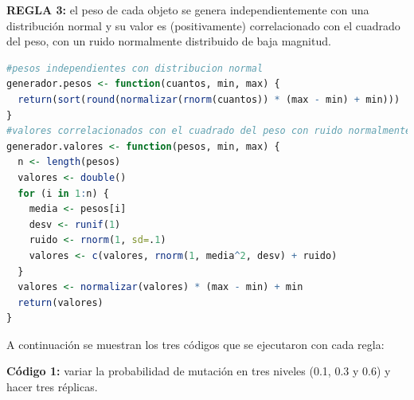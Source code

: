 \documentclass{article}
\begin{document}
\textbf{REGLA 3:} el peso de cada objeto se genera independientemente con una distribución normal y su valor es (positivamente) correlacionado con el cuadrado del peso, con un ruido normalmente distribuido de baja magnitud.

\lstset{style=mystyle}
\begin{lstlisting}[language=R, caption= Código para cumplir la regla 3.]
#pesos independientes con distribucion normal
generador.pesos <- function(cuantos, min, max) {
  return(sort(round(normalizar(rnorm(cuantos)) * (max - min) + min)))
}
#valores correlacionados con el cuadrado del peso con ruido normalmente distribuido de baja magnitud
generador.valores <- function(pesos, min, max) {
  n <- length(pesos)
  valores <- double()
  for (i in 1:n) {
    media <- pesos[i]
    desv <- runif(1)
    ruido <- rnorm(1, sd=.1)
    valores <- c(valores, rnorm(1, media^2, desv) + ruido)
  }
  valores <- normalizar(valores) * (max - min) + min
  return(valores)
}
\end{lstlisting}

A continuación se muestran los tres códigos que se ejecutaron con cada regla:
\bigskip

\textbf{Código 1:} variar la probabilidad de mutación en tres niveles (0.1, 0.3 y 0.6) y hacer tres réplicas.
\end{document}

